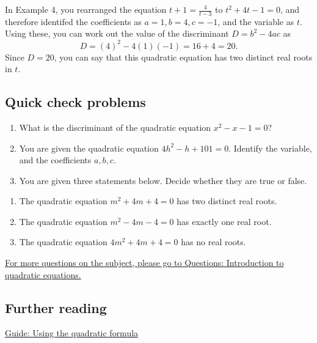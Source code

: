 \documentclass[
  12pt,
  a4paper, oneside]{starmastarticle}
\begin{document}
\begin{tcolorbox}[enhanced jigsaw, bottomrule=.15mm, colback=white, opacityback=0, rightrule=.15mm, breakable, left=2mm, arc=.35mm, toprule=.15mm, colframe=quarto-callout-note-color-frame, leftrule=.75mm]
\begin{minipage}[t]{5.5mm}
\textcolor{quarto-callout-note-color}{\faInfo}
\end{minipage}%
\begin{minipage}[t]{\textwidth - 5.5mm}
In Example 4, you rearranged the equation \(t+1 = \frac{4}{t-3}\) to
\(t^2 + 4t - 1 = 0\), and therefore identifed the coefficients as
\(a = 1, b = 4, c = -1\), and the variable as \(t\). Using these, you
can work out the value of the discriminant \(D = b^2 - 4ac\) as
\[D = (4)^2 - 4(1)(-1) = 16 + 4 = 20.\] Since \(D = 20\), you can say
that this quadratic equation has two distinct real roots in
\(t\).\end{minipage}%
\end{tcolorbox}

\hypertarget{quick-check-problems}{%
\subsection*{Quick check problems}\label{quick-check-problems}}

\begin{enumerate}
\def\labelenumi{\arabic{enumi}.}
\item
  What is the discriminant of the quadratic equation
  \(x^2 - x - 1 = 0\)?
\item
  You are given the quadratic equation \(4h^2 - h + 101 = 0\). Identify
  the variable, and the coefficients \(a,b,c\).
\item
  You are given three statements below. Decide whether they are true or
  false.
\end{enumerate}

\begin{enumerate}
\def\labelenumi{(\alph{enumi})}
\item
  The quadratic equation \(m^2 + 4m + 4 = 0\) has two distinct real
  roots.
\item
  The quadratic equation \(m^2 - 4m - 4 = 0\) has exactly one real root.
\item
  The quadratic equation \(4m^2 + 4m + 4 = 0\) has no real roots.
\end{enumerate}

\href{qs-introtoquadratics.qmd}{For more questions on the subject,
please go to Questions: Introduction to quadratic equations.}

\hypertarget{further-reading}{%
\subsection*{Further reading}\label{further-reading}}

\href{quadraticformula.html}{Guide: Using the quadratic formula}
\end{document}
